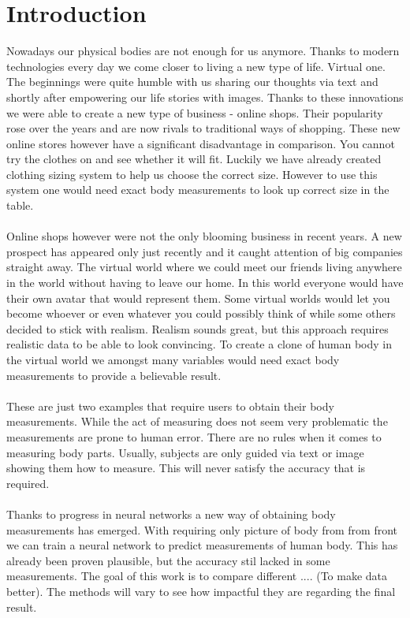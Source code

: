 \chapter*{Introduction}
Nowadays our physical bodies are not enough for us anymore. Thanks to modern technologies every day we come closer to living a new type of life. Virtual one. The beginnings were quite humble with us sharing our thoughts via text and shortly after empowering our life stories with images. Thanks to these innovations we were able to create a new type of business - online shops. Their popularity rose over the years and are now rivals to traditional ways of shopping. These new online stores however have a significant disadvantage in comparison. You cannot try the clothes on and see whether it will fit. Luckily we have already created clothing sizing system to help us choose the correct size. However to use this system one would need exact body measurements to look up correct size in the table. \\ \\
Online shops however were not the only blooming business in recent years. A new prospect has appeared only just recently and it caught attention of big companies straight away. The virtual world where we could meet our friends living anywhere in the world without having to leave our home. In this world everyone would have their own avatar that would represent them. Some virtual worlds would let you become whoever or even whatever you could possibly think of while some others decided to stick with realism. Realism sounds great, but this approach requires realistic data to be able to look convincing. To create a clone of human body in the virtual world we amongst many variables would need exact body measurements to provide a believable result.\\ \\
These are just two examples that require users to obtain their body measurements. While the act of measuring does not seem very problematic the measurements are prone to human error. There are no rules when it comes to measuring body parts. Usually, subjects are only guided via text or image showing them how to measure. This will never satisfy the accuracy that is required.\\ \\
Thanks to progress in neural networks a new way of obtaining body measurements has emerged. With requiring only picture of body from from front we can train a neural network to predict measurements of human body. This has already been proven plausible, but the accuracy stil lacked in some measurements. The goal of this work is to compare different .... (To make data better). The methods will vary to see how impactful they are regarding the final result.\\\\
